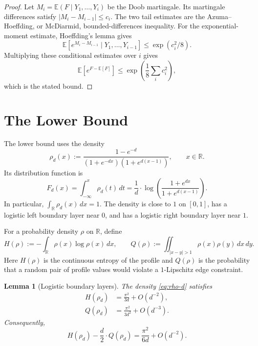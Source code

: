 \documentclass[11pt]{article}
\newtheorem{lemma}[theorem]{Lemma}
\theoremstyle{definition}
\newcommand{\RR}{\mathbb{R}}
\newcommand{\EE}{\mathbb{E}}
\begin{document}
\begin{proof}
Let $M_i=\EE(F\mid Y_1,\ldots,Y_i)$ be the Doob martingale.  Its martingale differences satisfy $|M_i-M_{i-1}|\le c_i$.  The two tail estimates are the Azuma--Hoeffding, or McDiarmid, bounded-differences inequality.  For the exponential-moment estimate, Hoeffding's lemma gives
\[
  \EE\left[e^{M_i-M_{i-1}}\mid Y_1,\ldots,Y_{i-1}\right]
  \le \exp(c_i^2/8).
\]
Multiplying these conditional estimates over $i$ gives
\[
  \EE \left[e^{F-\EE \left[F\right]}\right] \le \exp\left(\frac18\sum_i c_i^2\right),
\]
which is the stated bound.
\end{proof}

\section{The Lower Bound}

The lower bound uses the density
\begin{equation}\label{eq:rho-d}
  \rho_d(x):=\frac{1-e^{-d}}{(1+e^{-dx})(1+e^{d(x-1)})},
  \qquad x\in\RR.
\end{equation}
Its distribution function is
\begin{equation}\label{eq:rho-cdf}
  F_d(x)=\int_{-\infty}^x\rho_d(t)\,dt
  =\frac1d\cdot\log\left(\frac{1+e^{dx}}{1+e^{d(x-1)}}\right).
\end{equation}
In particular, $\int_\RR\rho_d(x)\,dx=1$.  The density is close to $1$ on $[0,1]$, has a logistic left boundary layer near $0$, and has a logistic right boundary layer near $1$.

\bigskip
\noindent
For a probability density $\rho$ on $\RR$, define
\begin{equation}\label{eq:H-Q}
  H(\rho):=-\int_\RR\rho(x)\log\rho(x)\,dx,
  \qquad
  Q(\rho):=\iint_{|x-y|>1}\rho(x)\rho(y)\,dx\,dy.
\end{equation}
Here $H(\rho)$ is the continuous entropy of the profile and $Q(\rho)$ is the probability that a random pair of profile values would violate a $1$-Lipschitz edge constraint.

\begin{lemma}[Logistic boundary layers]\label{lem:logistic}
The density \eqref{eq:rho-d} satisfies
\begin{align}
  H(\rho_d)&=\frac{\pi^2}{3d}+O(d^{-2}),\label{eq:entropy-rho}\\
  Q(\rho_d)&=\frac{\pi^2}{3d^2}+O(d^{-3}).\label{eq:bad-rho}
\end{align}
Consequently,
\begin{equation}\label{eq:profile-gain}
  H(\rho_d)-\frac d2 \cdot Q(\rho_d)=\frac{\pi^2}{6d}+O(d^{-2}).
\end{equation}
\end{lemma}
\end{document}
